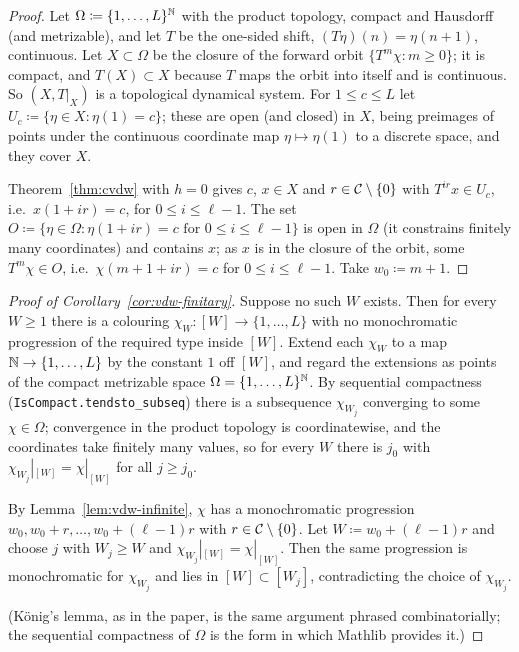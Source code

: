 \begin{proof}
  Let $\Omega \coloneqq \{1,\dots,L\}^{\mathbb{N}}$ with the product topology, compact and Hausdorff
  (and metrizable), and let $T$ be the one-sided shift, $(T\eta)(n) = \eta(n+1)$, continuous.
  Let $X \subset \Omega$ be the closure of the forward orbit $\{T^m\chi : m \geq 0\}$; it is
  compact, and $T(X) \subset X$ because $T$ maps the orbit into itself and is continuous.  So
  $(X, T|_X)$ is a topological dynamical system.  For $1 \leq c \leq L$ let
  $U_c \coloneqq \{\eta \in X : \eta(1) = c\}$; these are open (and closed) in $X$, being
  preimages of points under the continuous coordinate map $\eta \mapsto \eta(1)$ to a discrete
  space, and they cover $X$.

  Theorem~\ref{thm:cvdw} with $h = 0$ gives $c$, $x \in X$ and $r \in \mathcal{C}\setminus\{0\}$ with
  $T^{ir}x \in U_c$, i.e.\ $x(1 + ir) = c$, for $0 \leq i \leq \ell - 1$.  The set
  $O \coloneqq \{\eta \in \Omega : \eta(1+ir) = c \text{ for } 0 \leq i \leq \ell-1\}$ is open
  in $\Omega$ (it constrains finitely many coordinates) and contains $x$; as $x$ is in the closure
  of the orbit, some $T^m\chi \in O$, i.e.\ $\chi(m + 1 + ir) = c$ for $0 \leq i \leq \ell - 1$.
  Take $w_0 \coloneqq m + 1$.
\end{proof}

\begin{proof}[Proof of Corollary~\ref{cor:vdw-finitary}]
  Suppose no such $W$ exists.  Then for every $W \geq 1$ there is a colouring
  $\chi_W : [W] \to \{1,\dots,L\}$ with no monochromatic progression of the required type inside
  $[W]$.  Extend each $\chi_W$ to a map $\mathbb{N} \to \{1,\dots,L\}$ by the constant $1$ off $[W]$,
  and regard the extensions as points of the compact metrizable space
  $\Omega = \{1,\dots,L\}^{\mathbb{N}}$.  By sequential compactness
  (\texttt{IsCompact.tendsto\_subseq}) there is a subsequence $\chi_{W_j}$ converging to some
  $\chi \in \Omega$; convergence in the product topology is coordinatewise, and the coordinates
  take finitely many values, so for every $W$ there is $j_0$ with
  $\chi_{W_j}|_{[W]} = \chi|_{[W]}$ for all $j \geq j_0$.

  By Lemma~\ref{lem:vdw-infinite}, $\chi$ has a monochromatic progression
  $w_0, w_0 + r, \dots, w_0 + (\ell-1)r$ with $r \in \mathcal{C}\setminus\{0\}$.  Let
  $W \coloneqq w_0 + (\ell-1)r$ and choose $j$ with $W_j \geq W$ and
  $\chi_{W_j}|_{[W]} = \chi|_{[W]}$.  Then the same progression is monochromatic for
  $\chi_{W_j}$ and lies in $[W] \subset [W_j]$, contradicting the choice of $\chi_{W_j}$.

  (K\"onig's lemma, as in the paper, is the same argument phrased combinatorially; the
  sequential compactness of $\Omega$ is the form in which Mathlib provides it.)
\end{proof}
